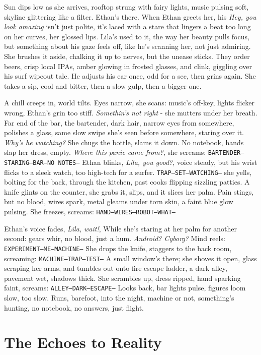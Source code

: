 \documentclass[12pt,oneside]{book}
\newcommand{\note}[1]{\texttt{#1}}
\begin{document}
Sun dips low as she arrives, rooftop strung with fairy lights, music pulsing soft, skyline glittering like a filter. Ethan’s there. When Ethan greets her, his \textit{Hey, you look amazing} isn’t just polite, it’s laced with a stare that lingers a beat too long on her curves, her glossed lips. Lila’s used to it, the way her beauty pulls focus, but something about his gaze feels off, like he’s scanning her, not just admiring. She brushes it aside, chalking it up to nerves, but the unease sticks. They order beers, crisp local IPAs, amber glowing in frosted glasses, and clink, giggling over his surf wipeout tale. He adjusts his ear once, odd for a sec, then grins again. She takes a sip, cool and bitter, then a slow gulp, then a bigger one.

A chill creeps in, world tilts. Eyes narrow, she scans: music’s off-key, lights flicker wrong, Ethan’s grin too stiff. \textit{Somethin’s not right} - she mutters under her breath. Far end of the bar, the bartender, dark hair, narrow eyes from somewhere, polishes a glass, same slow swipe she’s seen before somewhere, staring over it. \textit{Why’s he watching?} She chugs the bottle, slams it down. No notebook, hands slap her dress, empty. \textit{Where this panic came from?}, she screams: \note{BARTENDER—STARING—BAR—NO NOTES—} Ethan blinks, \textit{Lila, you good?}, voice steady, but his wrist flicks to a sleek watch, too high-tech for a surfer. \note{TRAP—SET—WATCHING—} she yells, bolting for the back, through the kitchen, past cooks flipping sizzling patties. A knife glints on the counter, she grabs it, slips, and it slices her palm. Pain stings, but no blood, wires spark, metal gleams under torn skin, a faint blue glow pulsing. She freezes, screams: \note{HAND—WIRES—ROBOT—WHAT—}

Ethan’s voice fades, \textit{Lila, wait!}, While she’s staring at her palm for another second: gears whir, no blood, just a hum. \textit{Android? Cyborg?} Mind reels: \note{EXPERIMENT—ME—MACHINE—} She drops the knife, staggers to the back room, screaming: \note{MACHINE—TRAP—TEST—} A small window’s there; she shoves it open, glass scraping her arms, and tumbles out onto fire escape ladder, a dark alley, pavement wet, shadows thick. She scrambles up, dress ripped, hand sparking faint, screams: \note{ALLEY—DARK—ESCAPE—} Looks back, bar lights pulse, figures loom slow, too slow. Runs, barefoot, into the night, machine or not, something’s hunting, no notebook, no answers, just flight.

\part{The Echoes to Reality}
\end{document}
